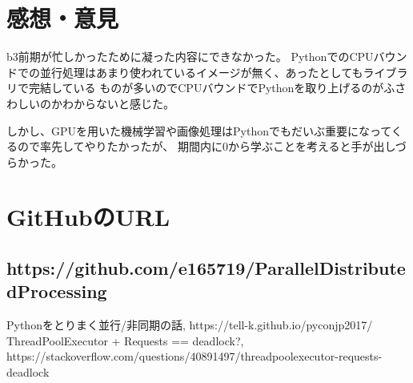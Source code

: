 \documentclass[14pt, oneside]{article}     	%
\begin{document}
\newpage

\section{感想・意見}
b3前期が忙しかったために凝った内容にできなかった。
PythonでのCPUバウンドでの並行処理はあまり使われているイメージが無く、あったとしてもライブラリで完結している
ものが多いのでCPUバウンドでPythonを取り上げるのがふさわしいのかわからないと感じた。

しかし、GPUを用いた機械学習や画像処理はPythonでもだいぶ重要になってくるので率先してやりたかったが、
期間内に0から学ぶことを考えると手が出しづらかった。
\section{GitHubのURL}
\subsection*{https://github.com/e165719/ParallelDistributedProcessing}
\begin{thebibliography}{9}
   Pythonをとりまく並行/非同期の話,  https://tell-k.github.io/pyconjp2017/
   ThreadPoolExecutor + Requests == deadlock?,  https://stackoverflow.com/questions/40891497/threadpoolexecutor-requests-deadlock
\end{thebibliography}
\end{document}
